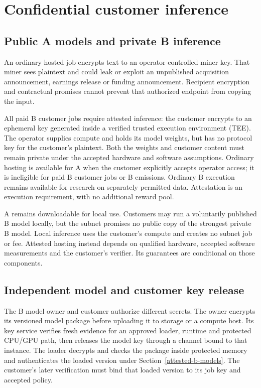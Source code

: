 \section{Confidential customer inference}\label{confidential-customer-inference}

\subsection{Public A models and private B inference}\label{customer-execution-modes}

An ordinary hosted job encrypts text to an operator-controlled miner key.
That miner sees plaintext and could leak or exploit an unpublished
acquisition announcement, earnings release or funding announcement.
Recipient encryption and contractual promises cannot prevent that
authorized endpoint from copying the input.

All paid B customer jobs require attested inference:
the customer encrypts to an ephemeral key generated inside a verified
trusted execution environment (TEE). The operator supplies compute and
holds its model weights, but has no protocol key for the customer's
plaintext. Both the weights and customer content must remain private
under the accepted hardware and software assumptions. Ordinary hosting
is available for A when the customer explicitly accepts operator access;
it is ineligible for paid B customer jobs or B emissions. Ordinary B
execution remains available for research on separately permitted data.
Attestation is an execution requirement, with no additional reward pool.

A remains downloadable for local use. Customers may run a voluntarily
published B model locally, but the subnet promises no public copy of
the strongest private B model. Local inference uses the customer's
compute and creates no subnet job or fee. Attested hosting instead
depends on qualified hardware, accepted software measurements and the
customer's verifier. Its guarantees are conditional on those components.

\subsection{Independent model and customer key release}\label{independent-key-release}

The B model owner and customer authorize different secrets. The owner
encrypts its versioned model package before uploading it to storage or
a compute host. Its key service verifies fresh evidence for an approved
loader, runtime and protected CPU/GPU path, then releases the model key
through a channel bound to that instance. The loader decrypts and checks
the package inside protected memory and authenticates the loaded version
under Section~\ref{attested-b-models}. The customer's later verification
must bind that loaded version to its job key and accepted policy.

